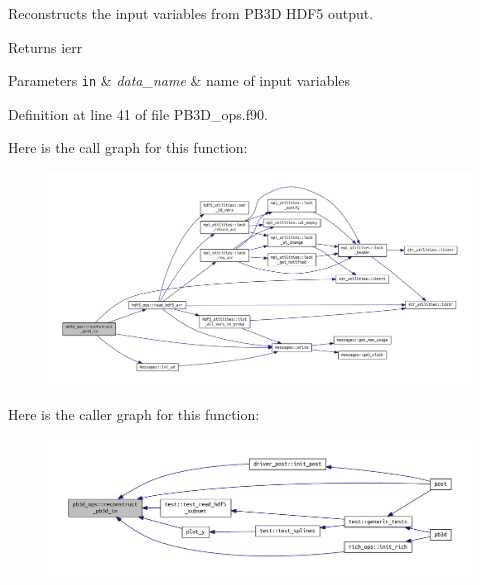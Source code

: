 Reconstructs the input variables from P\+B3D H\+D\+F5 output. 

\begin{DoxyReturn}{Returns}
ierr
\end{DoxyReturn}

\begin{DoxyParams}[1]{Parameters}
\mbox{\tt in}  & {\em data\+\_\+name} & name of input variables \\
\hline
\end{DoxyParams}


Definition at line 41 of file P\+B3\+D\+\_\+ops.\+f90.

Here is the call graph for this function\+:\nopagebreak
\begin{figure}[H]
\begin{center}
\leavevmode
\includegraphics[width=350pt]{namespacepb3d__ops_ad1481747b9b9832f816d4bf1dd2d6737_cgraph}
\end{center}
\end{figure}
Here is the caller graph for this function\+:\nopagebreak
\begin{figure}[H]
\begin{center}
\leavevmode
\includegraphics[width=350pt]{namespacepb3d__ops_ad1481747b9b9832f816d4bf1dd2d6737_icgraph}
\end{center}
\end{figure}
\mbox{\label{namespacepb3d__ops_ae7afc544227f34f2877eb5a14d620823}} 
